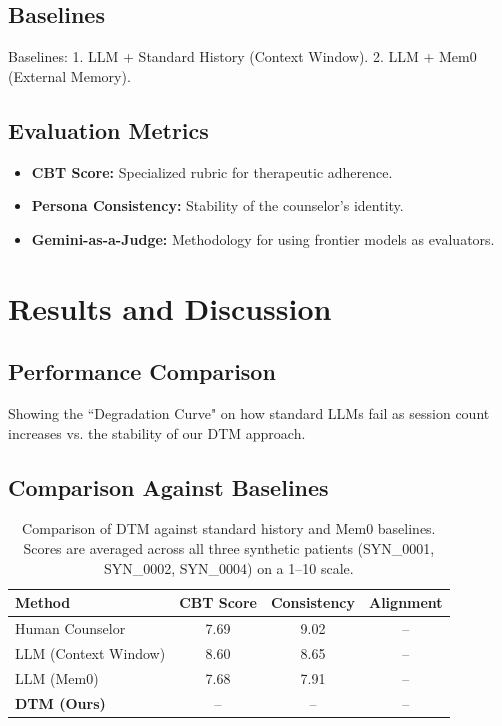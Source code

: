 \documentclass{article} %
\begin{document}
\subsection{Baselines}
Baselines: 1. LLM + Standard History (Context Window). 2. LLM + Mem0 (External Memory).

\subsection{Evaluation Metrics}
\begin{itemize}
    \item \textbf{CBT Score:} Specialized rubric for therapeutic adherence.
    \item \textbf{Persona Consistency:} Stability of the counselor's identity.
    \item \textbf{Gemini-as-a-Judge:} Methodology for using frontier models as evaluators.
\end{itemize}

\section{Results and Discussion}

\subsection{Performance Comparison}
Showing the ``Degradation Curve" on how standard LLMs fail as session count increases vs. the stability of our DTM approach.
\subsection{Comparison Against Baselines}

\begin{table}[h]
\centering
\caption{Comparison of DTM against standard history and Mem0 baselines. Scores are averaged across all three synthetic patients (SYN\_0001, SYN\_0002, SYN\_0004) on a 1--10 scale.}
\begin{tabular}{@{}lccc@{}}
\toprule
\textbf{Method} & \textbf{CBT Score} & \textbf{Consistency} & \textbf{Alignment} \\ \midrule
Human Counselor          & 7.69 & 9.02 & -- \\
LLM (Context Window)     & 8.60 & 8.65 & -- \\
LLM (Mem0)               & 7.68 & 7.91 & -- \\
\textbf{DTM (Ours)}      & --   & --   & -- \\ \bottomrule
\end{tabular}
\end{table}
\end{document}
